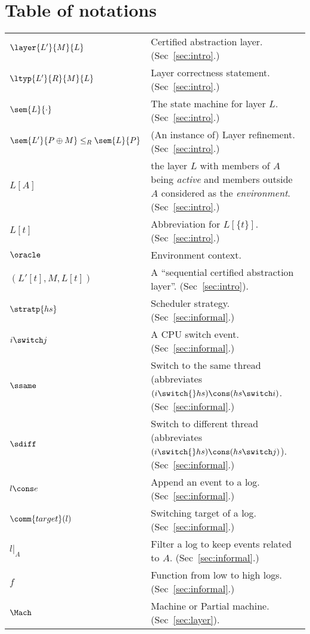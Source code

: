 \onecolumn

\section{Table of notations}


\begin{tabular}{lp{12cm}}
$\layer{L'}{M}{L}$ & Certified abstraction layer. (Sec~\ref{sec:intro}.) \\
$\ltyp{L'}{R}{M}{L}$  & Layer correctness
  statement. (Sec~\ref{sec:intro}.) \\
$\sem{L}{\cdot}$ & The state machine for layer
  $L$. (Sec~\ref{sec:intro}.) \\
$\sem{L'}{P\oplus{}M} \leq_R \sem{L}{P}$ & (An instance of) Layer refinement. (Sec~\ref{sec:intro}.) \\
$L[A]$ & the layer $L$ with members of $A$
  being {\em active} and members outside $A$ considered as the {\em environment}. (Sec~\ref{sec:intro}.)\\
$L[t]$ & Abbreviation for  $L[\{t\}]$.  (Sec~\ref{sec:intro}.) \\
  $\oracle$ & Environment context. \\
$(L'[t],M,L[t])$ & A ``sequential certified abstraction
  layer''. (Sec~\ref{sec:intro}).\\
  $\stratp{hs}$  & Scheduler strategy. (Sec~\ref{sec:informal}.)\\
$i \switch j$  & A CPU switch event. (Sec~\ref{sec:informal}.) \\
$\ssame$  & Switch to the same thread (abbreviates $(i\switch{}hs) \cons (hs\switch i)$. (Sec~\ref{sec:informal}.) \\
$\sdiff$ & Switch to different thread (abbreviates $(i\switch{}hs) \cons (hs\switch j)$). (Sec~\ref{sec:informal}.) \\
  $l \cons e$ & Append an event to a log. (Sec~\ref{sec:informal}.) \\
  $\comm{target}(l)$ & Switching target of a log. (Sec~\ref{sec:informal}.) \\
  $l |_A$ & Filter a log to keep events related to $A$. (Sec~\ref{sec:informal}.)\\
  $f$ & Function from low to high logs. (Sec~\ref{sec:informal}.)\\
  $\Mach$ & Machine or Partial machine. (Sec~\ref{sec:layer}). \\

\end{tabular}
